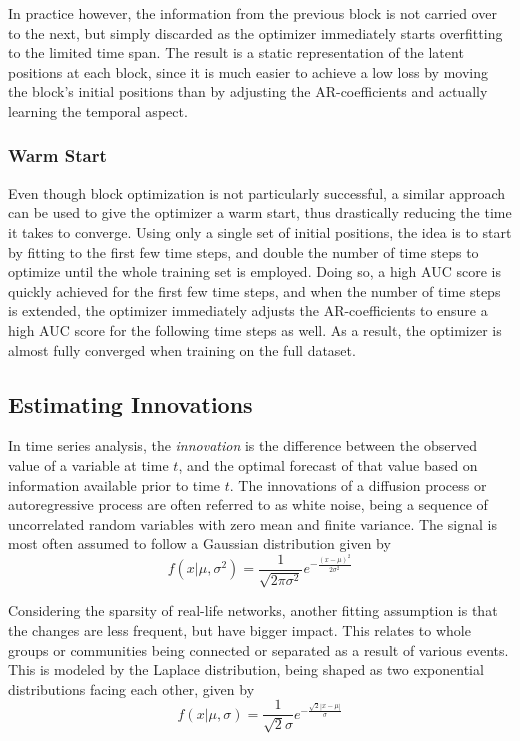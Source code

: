         In practice however, the information from the previous block is not carried over to the next, but simply discarded as the optimizer immediately starts overfitting to the limited time span. The result is a static representation of the latent positions at each block, since it is much easier to achieve a low loss by moving the block's initial positions than by adjusting the AR-coefficients and actually learning the temporal aspect.
        
    \subsubsection{Warm Start}
    
        Even though block optimization is not particularly successful, a similar approach can be used to give the optimizer a warm start, thus drastically reducing the time it takes to converge. Using only a single set of initial positions, the idea is to start by fitting to the first few time steps, and double the number of time steps to optimize until the whole training set is employed. Doing so, a high AUC score is quickly achieved for the first few time steps, and when the number of time steps is extended, the optimizer immediately adjusts the AR-coefficients to ensure a high AUC score for the following time steps as well. As a result, the optimizer is almost fully converged when training on the full dataset.
    
\subsection{Estimating Innovations}

    In time series analysis, the \emph{innovation} is the difference between the observed value of a variable at time $t$, and the optimal forecast of that value based on information available prior to time $t$. The innovations of a diffusion process or autoregressive process are often referred to as white noise, being a sequence of uncorrelated random variables with zero mean and finite variance. The signal is most often assumed to follow a Gaussian distribution given by
    \begin{equation}
        f(x\vert\mu,\sigma^2) = \frac{1}{\sqrt{2\pi\sigma^2}}e^{-\frac{(x-\mu)^2}{2\sigma^2}}
    \end{equation}
    
    Considering the sparsity of real-life networks, another fitting assumption is that the changes are less frequent, but have bigger impact. This relates to whole groups or communities being connected or separated as a result of various events. This is modeled by the Laplace distribution, being shaped as two exponential distributions facing each other, given by
    \begin{equation}
        f(x\vert\mu,\sigma)=\frac{1}{\sqrt{2}\sigma}e^{-\frac{\sqrt{2}|x-\mu|}{\sigma}}
    \end{equation}
    
